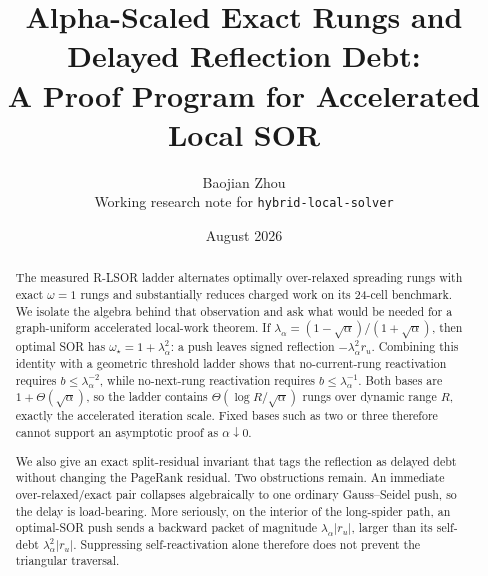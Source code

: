 \documentclass[11pt]{article}
\title{Alpha-Scaled Exact Rungs and Delayed Reflection Debt:\\
A Proof Program for Accelerated Local SOR}
\author{Baojian Zhou\\
\small Working research note for \texttt{hybrid-local-solver}}
\date{August 2026}
\begin{document}
\maketitle

\begin{abstract}
The measured R-LSOR ladder alternates optimally over-relaxed spreading rungs
with exact $\omega=1$ rungs and substantially reduces charged work on its
24-cell benchmark.  We isolate the algebra behind that observation and ask
what would be needed for a graph-uniform accelerated local-work theorem.  If
$\lambda_\alpha=(1-\sqrt\alpha)/(1+\sqrt\alpha)$, then optimal SOR has
$\omega_\star=1+\lambda_\alpha^2$: a push leaves signed reflection
$-\lambda_\alpha^2r_u$.  Combining this identity with a geometric threshold
ladder shows that no-current-rung reactivation requires
$b\leq\lambda_\alpha^{-2}$, while no-next-rung reactivation requires
$b\leq\lambda_\alpha^{-1}$.  Both bases are $1+\Theta(\sqrt\alpha)$, so the
ladder contains
$\Theta(\log R/\sqrt\alpha)$ rungs over dynamic range $R$, exactly the
accelerated iteration scale.  Fixed bases such as two or three therefore
cannot support an asymptotic proof as $\alpha\downarrow0$.

We also give an exact split-residual invariant that tags the reflection as
delayed debt without changing the PageRank residual.  Two obstructions remain.
An immediate over-relaxed/exact pair collapses algebraically to one ordinary
Gauss--Seidel push, so the delay is load-bearing.  More seriously, on the
interior of the long-spider path, an optimal-SOR push sends a backward packet
of magnitude $\lambda_\alpha|r_u|$, larger than its self-debt
$\lambda_\alpha^2|r_u|$.  Suppressing self-reactivation alone therefore does
not prevent the triangular traversal.


\end{abstract}
\end{document}

